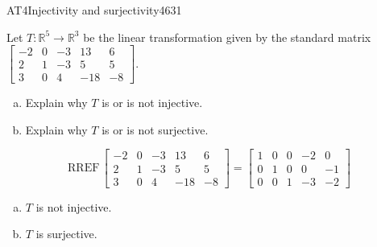 \begin{exercise}{AT4}{Injectivity and surjectivity}{4631} 
\begin{exerciseStatement} 

 Let \(T:\mathbb{R}^5 \to \mathbb{R}^3\) be the linear transformation given by the standard matrix \(\left[\begin{array}{ccccc}
-2 & 0 & -3 & 13 & 6 \\
2 & 1 & -3 & 5 & 5 \\
3 & 0 & 4 & -18 & -8
\end{array}\right]\). 

 

\begin{enumerate}[(a)]
\item 

Explain why \(T\) is or is not injective.


\item 

Explain why \(T\) is or is not surjective.


\end{enumerate}

     \end{exerciseStatement}
 \begin{exerciseAnswer} 

\[\mathrm{RREF}\,\left[\begin{array}{ccccc}
-2 & 0 & -3 & 13 & 6 \\
2 & 1 & -3 & 5 & 5 \\
3 & 0 & 4 & -18 & -8
\end{array}\right]=\left[\begin{array}{ccccc}
1 & 0 & 0 & -2 & 0 \\
0 & 1 & 0 & 0 & -1 \\
0 & 0 & 1 & -3 & -2
\end{array}\right]\]

 

\begin{enumerate}[(a)]
\item  

\(T\) is not injective.

 
\item  

\(T\) is surjective.

 
\end{enumerate}

     \end{exerciseAnswer}
 \end{exercise}


